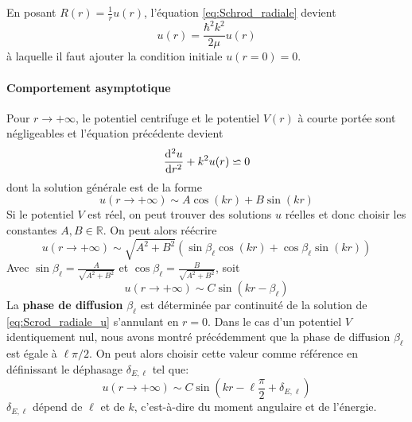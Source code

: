 En posant $R(r) = \frac{1}{r} u(r)$, l'équation \ref{eq:Schrod_radiale} devient
\begin{equation}
[- \frac{\hbar^2}{2\mu} \frac{\rmd^2}{\rmd r^2} + \frac{\ell(\ell+1)}{2 \mu r^2} + V(r)] u(r)  = \frac{\hbar^2 k^2}{2\mu} u(r)
\label{eq:Scrod_radiale_u}
\end{equation}
à laquelle il faut ajouter la condition initiale $u(r=0) = 0$. 

\paragraph*{Comportement asymptotique} Pour $r \rightarrow + \infty$, le potentiel centrifuge et le potentiel $V(r)$ à courte portée sont négligeables et l'équation précédente devient
\begin{equation}
\frac{\mathrm{d}^2 u}{\mathrm{d} r^2} + k^2 u(r) \backsimeq 0
\end{equation}
dont la solution générale est de la forme
\[ u(r \rightarrow + \infty) \sim A \cos(kr) + B \sin(kr) \]
Si le potentiel $V$ est réel, on peut trouver des solutions $u$ réelles et donc choisir les constantes $A, B \in \mathbb{R}$. On peut alors réécrire 
\begin{equation}
u(r \rightarrow + \infty) \sim \sqrt{A^2+B^2} (\sin \beta_\ell \cos(kr) + \cos \beta_\ell \sin(kr) )
\end{equation}
Avec $\sin \beta_\ell = \frac{A}{\sqrt{A^2+B^2}}$ et $\cos \beta_\ell = \frac{B}{\sqrt{A^2+B^2}}$, soit
\begin{equation}
u(r \rightarrow + \infty) \sim C \sin(kr - \beta_\ell)
\end{equation}
La \textbf{phase de diffusion} $\beta_\ell$ est déterminée par continuité de la solution de \ref{eq:Scrod_radiale_u} s'annulant en $r=0$. Dans le cas d'un potentiel $V$ identiquement nul, nous avons montré précédemment que la phase de diffusion $\beta_\ell$ est égale à $\ell \pi/2$. On peut alors choisir cette valeur comme référence en définissant le déphasage $\delta_{E,\ell}$ tel que:
\[ u(r \rightarrow + \infty) \sim C \sin(kr -\ell \frac{\pi}{2} + \delta_{E,\ell}) \]
$\delta_{E,\ell}$ dépend de $\ell$ et de $k$, c'est-à-dire du moment angulaire et de l'énergie.

